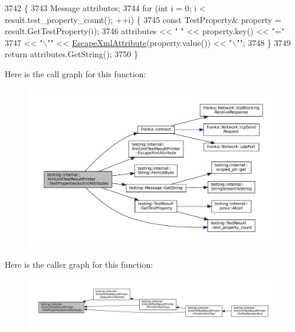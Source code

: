 \begin{DoxyCode}
3742                               \{
3743   Message attributes;
3744   \textcolor{keywordflow}{for} (\textcolor{keywordtype}{int} i = 0; i < result.test\_property\_count(); ++i) \{
3745     \textcolor{keyword}{const} TestProperty& \textcolor{keyword}{property} = result.GetTestProperty(i);
3746     attributes << \textcolor{stringliteral}{" "} << \textcolor{keyword}{property}.key() << \textcolor{stringliteral}{"="}
3747         << \textcolor{stringliteral}{"\(\backslash\)""} << \hyperlink{classtesting_1_1internal_1_1XmlUnitTestResultPrinter_aad574d7bb0c24578d5acc57817b9d367}{EscapeXmlAttribute}(property.value()) << \textcolor{stringliteral}{"\(\backslash\)""};
3748   \}
3749   \textcolor{keywordflow}{return} attributes.GetString();
3750 \}
\end{DoxyCode}
Here is the call graph for this function\+:
\nopagebreak
\begin{figure}[H]
\begin{center}
\leavevmode
\includegraphics[width=350pt]{classtesting_1_1internal_1_1XmlUnitTestResultPrinter_aaac4f1352a2cc46f6a69994d45999f0b_cgraph}
\end{center}
\end{figure}
Here is the caller graph for this function\+:
\nopagebreak
\begin{figure}[H]
\begin{center}
\leavevmode
\includegraphics[width=350pt]{classtesting_1_1internal_1_1XmlUnitTestResultPrinter_aaac4f1352a2cc46f6a69994d45999f0b_icgraph}
\end{center}
\end{figure}


